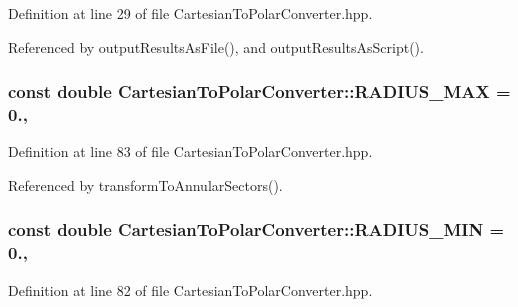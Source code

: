 Definition at line 29 of file Cartesian\-To\-Polar\-Converter.\-hpp.



Referenced by output\-Results\-As\-File(), and output\-Results\-As\-Script().

\hypertarget{classmultiscale_1_1video_1_1CartesianToPolarConverter_a79bb03defe0d68884ce5d4f1b0a7d60c}{
\subsubsection[{R\-A\-D\-I\-U\-S\-\_\-\-M\-A\-X}]{\setlength{\rightskip}{0pt plus 5cm}const double Cartesian\-To\-Polar\-Converter\-::\-R\-A\-D\-I\-U\-S\-\_\-\-M\-A\-X = 0.\hspace{0.3cm}{\ttfamily [static]}, {\ttfamily [private]}}}\label{classmultiscale_1_1video_1_1CartesianToPolarConverter_a79bb03defe0d68884ce5d4f1b0a7d60c}


Definition at line 83 of file Cartesian\-To\-Polar\-Converter.\-hpp.



Referenced by transform\-To\-Annular\-Sectors().

\hypertarget{classmultiscale_1_1video_1_1CartesianToPolarConverter_a59c18c22603ad65bf26533dd2aafd04e}{
\subsubsection[{R\-A\-D\-I\-U\-S\-\_\-\-M\-I\-N}]{\setlength{\rightskip}{0pt plus 5cm}const double Cartesian\-To\-Polar\-Converter\-::\-R\-A\-D\-I\-U\-S\-\_\-\-M\-I\-N = 0.\hspace{0.3cm}{\ttfamily [static]}, {\ttfamily [private]}}}\label{classmultiscale_1_1video_1_1CartesianToPolarConverter_a59c18c22603ad65bf26533dd2aafd04e}


Definition at line 82 of file Cartesian\-To\-Polar\-Converter.\-hpp.



